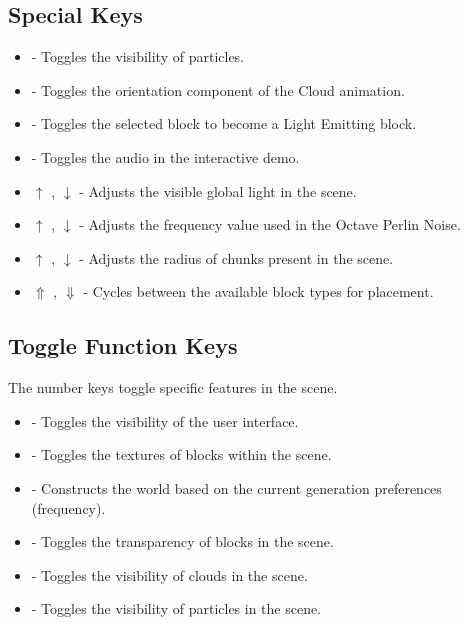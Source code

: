 \documentclass[a4paper,11pt,titlepage]{scrartcl}
\begin{document}
\subsection{Special Keys}
\begin{itemize}
	\item {} - Toggles the visibility of particles.
	\item {} - Toggles the orientation component of the Cloud animation.
	\item {} - Toggles the selected block to become a Light Emitting block.
	\item {} - Toggles the audio in the interactive demo.
	\item $\uparrow$ , $\downarrow$  - Adjusts the visible global light in the scene.
	\item $\uparrow$ , $\downarrow$  - Adjusts the frequency value used in the Octave Perlin Noise.
	\item $\uparrow$ , $\downarrow$  - Adjusts the radius of chunks present in the scene.
	\item $\Uparrow$ , $\Downarrow$  - Cycles between the available block types for placement.
\end{itemize}
      
\subsection{Toggle Function Keys}
The number keys toggle specific features in the scene.
\begin{itemize}
	\item {} - Toggles the visibility of the user interface.
	\item {} - Toggles the textures of blocks within the scene.
	\item {} - Constructs the world based on the current generation preferences (frequency).
	\item {} - Toggles the transparency of blocks in the scene.
	\item {} - Toggles the visibility of clouds in the scene.
	\item {} - Toggles the visibility of particles in the scene.
\end{itemize}

\end{document}
